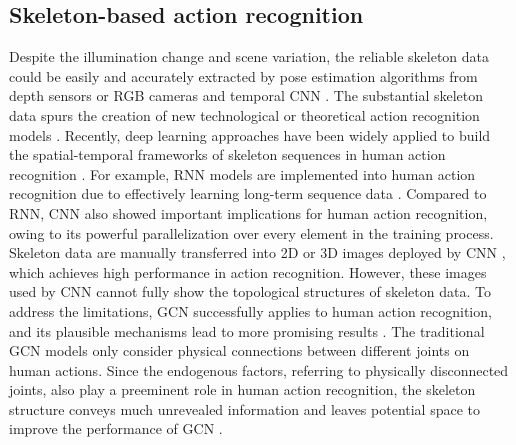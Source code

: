 \documentclass[journal]{IEEEtran}
\begin{document}
\subsection{Skeleton-based action recognition}
Despite the illumination change and scene variation, the reliable skeleton data could be easily and accurately extracted by pose estimation algorithms from depth sensors \cite{kay2017kinetics} or RGB cameras \cite{Shahroudy_2016_NTURGBD,xiu2018pose} and temporal CNN \cite{li2017person}. The substantial skeleton data spurs the creation of new technological or theoretical action recognition models \cite{stergiou2020learning}. Recently, deep learning approaches have been widely applied to build the spatial-temporal frameworks of skeleton sequences in human action recognition \cite{dhiman2020view}. For example, RNN models are implemented into human action recognition due to effectively learning long-term sequence data \cite{li2017adaptive}. Compared to RNN, CNN also showed important implications for human action recognition, owing to its powerful parallelization over every element in the training process. Skeleton data are manually transferred into 2D or 3D images deployed by CNN \cite{yang2020sta}, which achieves high performance in action recognition. However, these images used by CNN cannot fully show the topological structures of skeleton data. To address the limitations, GCN successfully applies to human action recognition, and its plausible mechanisms lead to more promising results \cite{yan2018spatial}. The traditional GCN models only consider physical connections between different joints on human actions. Since the endogenous factors, referring to physically disconnected joints, also play a preeminent role in human action recognition, the skeleton structure conveys much unrevealed information and leaves potential space to improve the performance of GCN \cite{weng2017spatio}.
\end{document}
